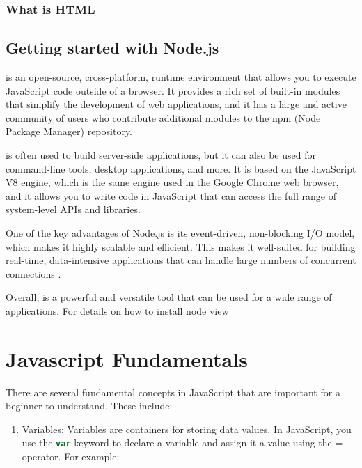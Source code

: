 {%

\subsubsection{What is HTML}


\subsection{Getting started with Node.js}

 is an open-source, cross-platform, runtime environment that allows you to execute JavaScript code outside of a browser. It provides a rich set of built-in modules that simplify the development of web applications, and it has a large and active community of users who contribute additional modules to the npm (Node Package Manager) repository.

 is often used to build server-side applications, but it can also be used for command-line tools, desktop applications, and more. It is based on the JavaScript V8 engine, which is the same engine used in the Google Chrome web browser, and it allows you to write code in JavaScript that can access the full range of system-level APIs and libraries.

One of the key advantages of Node.js is its event-driven, non-blocking I/O model, which makes it highly scalable and efficient. This makes it well-suited for building real-time, data-intensive applications that can handle large numbers of concurrent connections \cite{whyNode}.

Overall,  is a powerful and versatile tool that can be used for a wide range of applications. For details on how to install node view 

\section{Javascript Fundamentals}

There are several fundamental concepts in JavaScript that are important for a beginner to understand. These include:

\begin{enumerate}
\item Variables: Variables are containers for storing data values. In JavaScript, you use the \lstinline[language=Javascript]{var} keyword to declare a variable and assign it a value using the = operator. For example:


\end{enumerate}}
